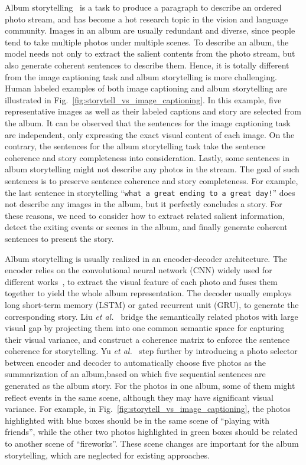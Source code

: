 \documentclass[letterpaper]{article} \usepackage{aaai19}  \usepackage{times}  \usepackage{helvet}  \usepackage{courier}  \usepackage{url}  \usepackage{graphicx}  \usepackage{color}
\begin{document}
Album storytelling~\cite{yu2017hierarchically,huang2016visual,liu2017video} is a task to  produce a paragraph to describe an ordered photo stream, and has become a hot research topic in the vision and language community. Images in an album are usually redundant and diverse, since people tend to take multiple photos under multiple scenes. To describe an album, the model needs not only to extract the salient contents from the photo stream, but also generate coherent sentences to describe them. Hence, it is totally different from the image captioning task and album storytelling is more challenging.
Human labeled examples of both image captioning and album storytelling are illustrated in Fig.~\ref{fig:storytell_vs_image_captioning}.
In this example, five representative images as well as their labeled captions and story are selected from the album.
It can be observed that the sentences for the image captioning task are independent, only expressing the exact visual content of each image.
On the contrary, the sentences for the album storytelling task take the sentence coherence and story completeness into consideration. Lastly, some sentences in album storytelling might not describe any photos in the stream. The goal of such sentences is to preserve sentence coherence and story completeness. For example, the last sentence in storytelling ``\texttt{what a great ending to a great day!}'' does not describe any images in the album, but it perfectly concludes a story.
For these reasons, we need to consider how to extract related salient information, detect the exiting events or scenes in the album, and finally generate coherent sentences to present the story.




Album storytelling  is usually realized in an encoder-decoder architecture. The encoder relies on the convolutional neural network (CNN) widely used for different works~\cite{zhang2017learning,zhang2018intra,zhang2018long,ma2016learning,qi2018hedging}, to extract the visual feature of each photo and fuses them together to yield the whole album representation.
The decoder usually employs long short-term memory (LSTM) or gated recurrent unit (GRU), to generate the corresponding story.
Liu \textit{et al.}~\cite{liu2017let} bridge the semantically related photos with large visual gap by projecting them into one common semantic space for capturing their visual variance, and construct a coherence matrix to enforce the sentence coherence for storytelling. Yu \textit{et al.}~\cite{yu2017hierarchically} step further by introducing a photo selector between encoder and decoder to automatically choose five photos as the summarization of an album,based on which five sequential sentences are generated as the album story.
For the photos in one album, some of them might reflect events in the same scene, although they may have significant visual variance. For example, in Fig.~\ref{fig:storytell_vs_image_captioning}, the photos highlighted with blue boxes should be in the same scene of ``playing with friends'', while the other two photos highlighted in green boxes should be related to another scene of ``fireworks''. These  scene changes are important for the album storytelling, which are neglected for existing approaches.
\end{document}
